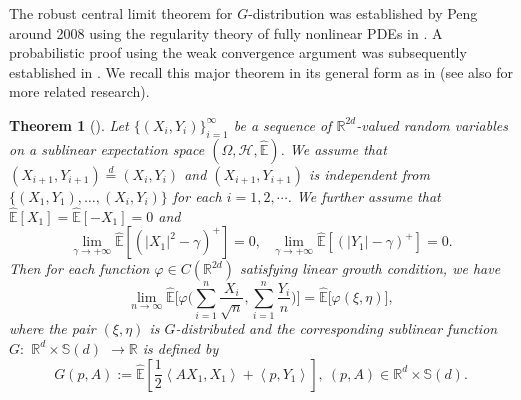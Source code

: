 \documentclass[a4paper,oneside,10pt]{article}%
\newtheorem{theorem}{Theorem}[section]
\numberwithin{equation}{section}
\begin{document}
The robust central limit theorem for $G$-distribution was established by Peng
around 2008 using the regularity theory of fully nonlinear PDEs in
\cite{P20082}. A probabilistic proof using the weak convergence argument was
subsequently established in \cite{P2010_CLT}. We recall this major theorem in
its general form as in \cite[Theorem 2.4.7]{P2010} (see also
\cite{C2016,GL2021,Z2016} for more related research).

\begin{theorem}
[\cite{P2010}]\label{LLT+CLT}Let $\{(X_{i},Y_{i})\}_{i=1}^{\infty}$ be a
sequence of $\mathbb{R}^{2d}$-valued random variables on a sublinear
expectation space $(\Omega,\mathcal{H},\mathbb{\hat{E}})$. We assume that
$(X_{i+1},Y_{i+1})\overset{d}{=}(X_{i},Y_{i})$ and $(X_{i+1},Y_{i+1})$ is
independent from $\{(X_{1},Y_{1}),\ldots,(X_{i},Y_{i})\}$ for each
$i=1,2,\cdots$. We further assume that $\mathbb{\hat{E}}[X_{1}]=\mathbb{\hat
{E}}[-X_{1}]=0$ and
\[
\lim \limits_{\gamma \rightarrow+\infty}\mathbb{\hat{E}}[(|X_{1}|^{2}-
\gamma)^{+}]=0,\text{ \ }\lim \limits_{\gamma \rightarrow+\infty}\mathbb{\hat
{E}}[(|Y_{1}|-\gamma)^{+}]=0.
\]
Then for each function $\varphi \in C(\mathbb{R}^{2d})$ satisfying linear
growth condition, we have
\[
\lim_{n\rightarrow \infty}\mathbb{\hat{E}}\bigg[\varphi \bigg(\sum_{i=1}^{n}
\frac{X_{i}}{\sqrt{n}},\sum_{i=1}^{n}\frac{Y_{i}}{n}\bigg)\bigg]=\mathbb{\hat
{E}}\big[\varphi(\xi,\eta)\big],
\]
where the pair $(\xi,\eta)$ is $G$-distributed and the corresponding sublinear
function $G:$ $\mathbb{R}^{d}\times \mathbb{S}(d)$ $\rightarrow \mathbb{R}$ is
defined by
\[
G\left(  p,A\right)  :=\mathbb{\hat{E}}\left[  \frac{1}{2}\left \langle
AX_{1},X_{1}\right \rangle +\left \langle p,Y_{1}\right \rangle \right]
,\ (p,A)\in \mathbb{R}^{d}\times \mathbb{S}(d).
\]

\end{theorem}

\end{document}
